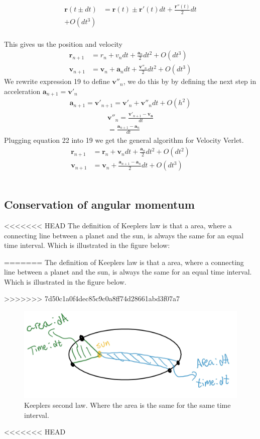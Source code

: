 \documentclass{article}
\begin{document}
\begin{multicols}{2}
\begin{align}
\mathbf{r}(t\pm dt)&=\mathbf{r}(t)\pm \mathbf{r}'(t)dt + \frac{\mathbf{r}''(t)}{2}dt\\ + O(dt^3)
\end{align}\\
This gives us the position and velocity 
\begin{align}
    \mathbf{r}_{n+1}&=r_n+v_ndt + \frac{\mathbf{a}_n}{2}dt^2+O(dt^3)\\
    \mathbf{v}_{n+1}&=\mathbf{v}_n+\mathbf{a}_ndt+\frac{\mathbf{v}''_n}{2}dt^2 + O(dt^3)
\end{align}
We rewrite expression 19 to define $\mathbf{v}''_n$, we do this by by defining the next step in acceleration $\mathbf{a}_{n+1}=\mathbf{v}'_n$ 
\begin{align}
    \mathbf{a}_{n+1}=\mathbf{v}'_{n+1}=\mathbf{v}'_n+\mathbf{v}''_ndt + O(h^2)
\end{align}
\begin{align}
        \mathbf{v}''_n=\frac{\mathbf{v}'_{n+1}-\mathbf{v_n}}{dt}\\
    =\frac{\mathbf{a}_{n+1}-\mathbf{a}_n}{dt}
\end{align}
Plugging equation 22 into 19 we get the general algorithm for Velocity Verlet. 
\begin{align}
    \mathbf{r}_{n+1}&=\mathbf{r}_n+\mathbf{v}_ndt+\frac{\mathbf{a}_n}{2}dt^2+O(dt^2)\\
    \mathbf{v}_{n+1}&=\mathbf{v}_n+\frac{\mathbf{a}_{n+1}-\mathbf{a}_n}{2}dt+O(dt^3)
\end{align}
\\
\subsection{Conservation of angular momentum}
<<<<<<< HEAD
The definition of Keeplers law is that a area, where a connecting line between a planet and the sun, is always the same for an equal time interval. Which is illustrated in the figure below:


=======
The definition of Keeplers law is that a area, where a connecting line between a planet and the sun, is always the same for an equal time interval. Which is illustrated in the figure below.

>>>>>>> 7d50c1a0f4dec85c9c0a8ff74d28661abd3f07a7
\begin{figure}[H]
	\centering
	\includegraphics[width=\linewidth]{K2L.jpg}
	\caption{Keeplers second law. Where the area is the same for the same time interval.}
	\label{fig:1bplot}
\end{figure}
<<<<<<< HEAD


\end{multicols}
\end{document}
